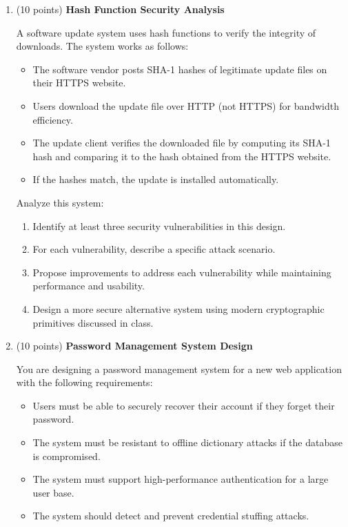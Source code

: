 \documentclass[10pt,a4paper,american]{article}
\begin{document}
\begin{enumerate}
	\item (10 points) \textbf{Hash Function Security Analysis}

	      A software update system uses hash functions to verify the integrity of downloads. The system works as follows:
	      \begin{itemize}
		      \item The software vendor posts SHA-1 hashes of legitimate update files on their HTTPS website.
		      \item Users download the update file over HTTP (not HTTPS) for bandwidth efficiency.
		      \item The update client verifies the downloaded file by computing its SHA-1 hash and comparing it to the hash obtained from the HTTPS website.
		      \item If the hashes match, the update is installed automatically.
	      \end{itemize}

	      Analyze this system:
	      \begin{enumerate}
		      \item Identify at least three security vulnerabilities in this design.
		      \item For each vulnerability, describe a specific attack scenario.
		      \item Propose improvements to address each vulnerability while maintaining performance and usability.
		      \item Design a more secure alternative system using modern cryptographic primitives discussed in class.
	      \end{enumerate}

	\item (10 points) \textbf{Password Management System Design}

	      You are designing a password management system for a new web application with the following requirements:
	      \begin{itemize}
		      \item Users must be able to securely recover their account if they forget their password.
		      \item The system must be resistant to offline dictionary attacks if the database is compromised.
		      \item The system must support high-performance authentication for a large user base.
		      \item The system should detect and prevent credential stuffing attacks.
	      \end{itemize}


\end{enumerate}
\end{document}
